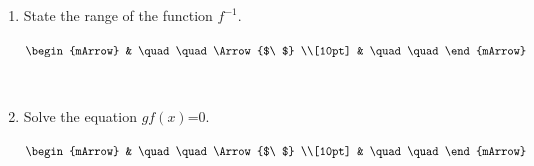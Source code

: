 \begin{mtask}[resume]
\begin{enumerate}[label=(\alph*)]
			\clearpage\noindent%
			\item State the range of the function $f^{-1}$.
		        \begin{envSolution}[height=3cm]
			       $\begin{mArrow}
			             &  \quad\quad      \Arrow{$\ $} \\[10pt]
                         &  \quad\quad	   
	                \end{mArrow}$
                \end{envSolution} 			  
		  	    \begin{exercise}\begin{shortsolution}  
				       $ \quad\quad  $
			    \end{shortsolution}\end{exercise}

			\item Solve the equation $gf(x)$=0.
		        \begin{envSolution}[height=3cm]
			       $\begin{mArrow}
			             &  \quad\quad      \Arrow{$\ $} \\[10pt]
                         &  \quad\quad	   
	                \end{mArrow}$
                \end{envSolution} 			  
		  	    \begin{exercise}\begin{shortsolution}  
				       $ \quad\quad  $
			    \end{shortsolution}\end{exercise}

		    \end{enumerate}		
\end{mtask}
				
